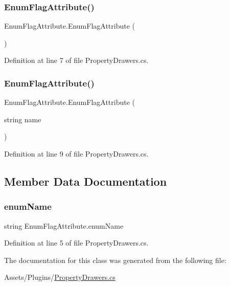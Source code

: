 \subsubsection{\texorpdfstring{Enum\+Flag\+Attribute()}{EnumFlagAttribute()}\hspace{0.1cm}{\footnotesize\ttfamily [1/2]}}
{\footnotesize\ttfamily Enum\+Flag\+Attribute.\+Enum\+Flag\+Attribute (\begin{DoxyParamCaption}{ }\end{DoxyParamCaption})}



Definition at line 7 of file Property\+Drawers.\+cs.

\mbox{\label{class_enum_flag_attribute_ae410b2b26b66afb5c2b63a81fb28bfcc}} 
\subsubsection{\texorpdfstring{Enum\+Flag\+Attribute()}{EnumFlagAttribute()}\hspace{0.1cm}{\footnotesize\ttfamily [2/2]}}
{\footnotesize\ttfamily Enum\+Flag\+Attribute.\+Enum\+Flag\+Attribute (\begin{DoxyParamCaption}\item[{string}]{name }\end{DoxyParamCaption})}



Definition at line 9 of file Property\+Drawers.\+cs.



\subsection{Member Data Documentation}
\mbox{\label{class_enum_flag_attribute_a766d6f5622734487542a0855bb2af743}} 
\subsubsection{\texorpdfstring{enum\+Name}{enumName}}
{\footnotesize\ttfamily string Enum\+Flag\+Attribute.\+enum\+Name}



Definition at line 5 of file Property\+Drawers.\+cs.



The documentation for this class was generated from the following file\+:\begin{DoxyCompactItemize}
\item 
Assets/\+Plugins/\mbox{\hyperlink{_property_drawers_8cs}{Property\+Drawers.\+cs}}\end{DoxyCompactItemize}
